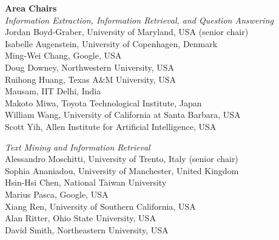 {\bf Area Chairs} \\
\emph{Information Extraction, Information Retrieval, and Question Answering} \\
\hspace*{0.2in}Jordan Boyd-Graber, University of Maryland, USA (senior chair) \\
\hspace*{0.2in}Isabelle Augenstein, University of Copenhagen, Denmark \\
\hspace*{0.2in}Ming-Wei Chang, Google, USA \\
\hspace*{0.2in}Doug Downey, Northwestern University, USA\\
\hspace*{0.2in}Ruihong Huang, Texas A\&M University, USA\\
\hspace*{0.2in}Mausam, IIT Delhi, India\\
\hspace*{0.2in}Makoto Miwa, Toyota Technological Institute, Japan\\
\hspace*{0.2in}William Wang, University of California at Santa Barbara, USA\\
\hspace*{0.2in}Scott Yih, Allen Institute for Artificial Intelligence, USA

\emph{Text Mining and Information Retrieval} \\
\hspace*{0.2in}Alessandro Moschitti, University of Trento, Italy (senior chair)\\
\hspace*{0.2in}Sophia Ananiadou, University of Manchester, United Kingdom\\
\hspace*{0.2in}Hsin-Hsi Chen, National Taiwan University\\
\hspace*{0.2in}Marius Pasca, Google, USA\\
\hspace*{0.2in}Xiang Ren, University of Southern California, USA\\
\hspace*{0.2in}Alan Ritter, Ohio State University, USA\\
\hspace*{0.2in}David Smith, Northeastern University, USA

